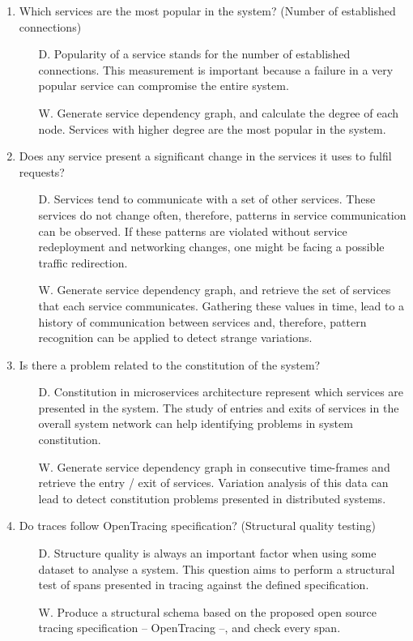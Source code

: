 \begin{enumerate}
    \item Which services are the most popular in the system? (Number of established connections)
          \begin{itemize}
              \item[D.] Popularity of a service stands for the number of established connections. This measurement is important because a failure in a very popular service can compromise the entire system.
              \item[W.] Generate service dependency graph, and calculate the degree of each node. Services with higher degree are the most popular in the system.
          \end{itemize}

    \item Does any service present a significant change in the services it uses to fulfil requests?
          \begin{itemize}
              \item[D.] Services tend to communicate with a set of other services. These services do not change often, therefore, patterns in service communication can be observed. If these patterns are violated without service redeployment and networking changes, one might be facing a possible traffic redirection.
              \item[W.] Generate service dependency graph, and retrieve the set of services that each service communicates. Gathering these values in time, lead to a history of communication between services and, therefore, pattern recognition can be applied to detect strange variations.
          \end{itemize}

    \item Is there a problem related to the constitution of the system?
          \begin{itemize}
              \item[D.] Constitution in microservices architecture represent which services are presented in the system. The study of entries and exits of services in the overall system network can help identifying problems in system constitution.
              \item[W.] Generate service dependency graph in consecutive time-frames and retrieve the entry / exit of services. Variation analysis of this data can lead to detect constitution problems presented in distributed systems.
          \end{itemize}

    \item Do traces follow OpenTracing specification? (Structural quality testing)
          \begin{itemize}
              \item[D.] Structure quality is always an important factor when using some dataset to analyse a system. This question aims to perform a structural test of spans presented in tracing against the defined specification.
              \item[W.] Produce a structural schema based on the proposed open source tracing specification -- OpenTracing --, and check every span.
          \end{itemize}


\end{enumerate}
